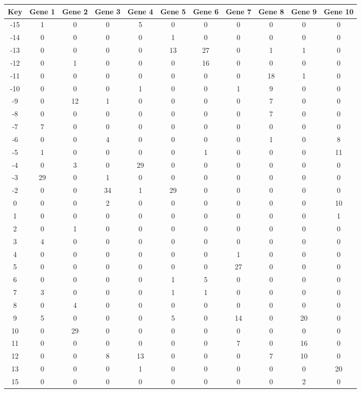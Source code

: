 \begin{tabular}{|c|c|c|c|c|c|c|c|c|c|c|}
\hline
Key & Gene 1 & Gene 2 & Gene 3 & Gene 4 & Gene 5 & Gene 6 & Gene 7 & Gene 8 & Gene 9 & Gene 10 \\
\hline
-15 & 1 & 0 & 0 & 5 & 0 & 0 & 0 & 0 & 0 & 0 \\
-14 & 0 & 0 & 0 & 0 & 1 & 0 & 0 & 0 & 0 & 0 \\
-13 & 0 & 0 & 0 & 0 & 13 & 27 & 0 & 1 & 1 & 0 \\
-12 & 0 & 1 & 0 & 0 & 0 & 16 & 0 & 0 & 0 & 0 \\
-11 & 0 & 0 & 0 & 0 & 0 & 0 & 0 & 18 & 1 & 0 \\
-10 & 0 & 0 & 0 & 1 & 0 & 0 & 1 & 9 & 0 & 0 \\
-9 & 0 & 12 & 1 & 0 & 0 & 0 & 0 & 7 & 0 & 0 \\
-8 & 0 & 0 & 0 & 0 & 0 & 0 & 0 & 7 & 0 & 0 \\
-7 & 7 & 0 & 0 & 0 & 0 & 0 & 0 & 0 & 0 & 0 \\
-6 & 0 & 0 & 4 & 0 & 0 & 0 & 0 & 1 & 0 & 8 \\
-5 & 1 & 0 & 0 & 0 & 0 & 1 & 0 & 0 & 0 & 11 \\
-4 & 0 & 3 & 0 & 29 & 0 & 0 & 0 & 0 & 0 & 0 \\
-3 & 29 & 0 & 1 & 0 & 0 & 0 & 0 & 0 & 0 & 0 \\
-2 & 0 & 0 & 34 & 1 & 29 & 0 & 0 & 0 & 0 & 0 \\
0 & 0 & 0 & 2 & 0 & 0 & 0 & 0 & 0 & 0 & 10 \\
1 & 0 & 0 & 0 & 0 & 0 & 0 & 0 & 0 & 0 & 1 \\
2 & 0 & 1 & 0 & 0 & 0 & 0 & 0 & 0 & 0 & 0 \\
3 & 4 & 0 & 0 & 0 & 0 & 0 & 0 & 0 & 0 & 0 \\
4 & 0 & 0 & 0 & 0 & 0 & 0 & 1 & 0 & 0 & 0 \\
5 & 0 & 0 & 0 & 0 & 0 & 0 & 27 & 0 & 0 & 0 \\
6 & 0 & 0 & 0 & 0 & 1 & 5 & 0 & 0 & 0 & 0 \\
7 & 3 & 0 & 0 & 0 & 1 & 1 & 0 & 0 & 0 & 0 \\
8 & 0 & 4 & 0 & 0 & 0 & 0 & 0 & 0 & 0 & 0 \\
9 & 5 & 0 & 0 & 0 & 5 & 0 & 14 & 0 & 20 & 0 \\
10 & 0 & 29 & 0 & 0 & 0 & 0 & 0 & 0 & 0 & 0 \\
11 & 0 & 0 & 0 & 0 & 0 & 0 & 7 & 0 & 16 & 0 \\
12 & 0 & 0 & 8 & 13 & 0 & 0 & 0 & 7 & 10 & 0 \\
13 & 0 & 0 & 0 & 1 & 0 & 0 & 0 & 0 & 0 & 20 \\
15 & 0 & 0 & 0 & 0 & 0 & 0 & 0 & 0 & 2 & 0 \\
\hline
\end{tabular}